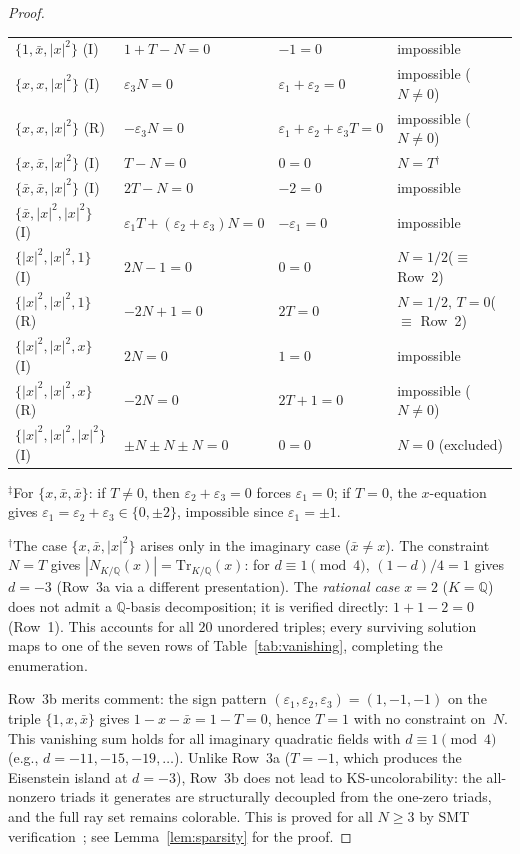 \documentclass[12pt,a4paper]{article}
\newcommand{\Q}{\mathbb{Q}}
\newcommand{\Norm}[1]{N_{K/\Q}\!\left(#1\right)}
\newcommand{\Tr}[1]{\mathrm{Tr}_{K/\Q}\!\left(#1\right)}
\begin{document}
\begin{proof}
\begin{center}
\begin{tabular}{@{}llll@{}}
$\{1, \bar{x}, |x|^2\}$ (I) & $1 + T - N = 0$ & $-1 = 0$ & impossible \\
$\{x, x, |x|^2\}$ (I) & $\varepsilon_3 N = 0$ & $\varepsilon_1{+}\varepsilon_2 = 0$ & impossible ($N \neq 0$) \\
$\{x, x, |x|^2\}$ (R) & $-\varepsilon_3 N = 0$ & $\varepsilon_1{+}\varepsilon_2{+}\varepsilon_3 T = 0$ & impossible ($N \neq 0$) \\
$\{x, \bar{x}, |x|^2\}$ (I) & $T - N = 0$ & $0 = 0$ & $N = T$\;$^\dagger$ \\
$\{\bar{x}, \bar{x}, |x|^2\}$ (I) & $2T - N = 0$ & $-2 = 0$ & impossible \\
$\{\bar{x}, |x|^2, |x|^2\}$ (I) & $\varepsilon_1 T + (\varepsilon_2{+}\varepsilon_3) N = 0$ & $-\varepsilon_1 = 0$ & impossible \\
$\{|x|^2, |x|^2, 1\}$ (I) & $2N - 1 = 0$ & $0 = 0$ & $N = 1/2$\;($\equiv$ Row~2) \\
$\{|x|^2, |x|^2, 1\}$ (R) & $-2N + 1 = 0$ & $2T = 0$ & $N = 1/2,\, T = 0$\;($\equiv$ Row~2) \\
$\{|x|^2, |x|^2, x\}$ (I) & $2N = 0$ & $1 = 0$ & impossible \\
$\{|x|^2, |x|^2, x\}$ (R) & $-2N = 0$ & $2T + 1 = 0$ & impossible ($N \neq 0$) \\
$\{|x|^2, |x|^2, |x|^2\}$ (I) & $\pm N \pm N \pm N = 0$ & $0 = 0$ & $N = 0$ (excluded) \\
\bottomrule
\end{tabular}
\end{center}
\smallskip

\noindent $^\ddagger$For $\{x, \bar{x}, \bar{x}\}$: if $T \neq 0$,
then $\varepsilon_2 + \varepsilon_3 = 0$ forces $\varepsilon_1 = 0$;
if $T = 0$, the $x$-equation gives
$\varepsilon_1 = \varepsilon_2 + \varepsilon_3 \in \{0, \pm 2\}$,
impossible since $\varepsilon_1 = \pm 1$.

\noindent $^\dagger$The case $\{x, \bar{x}, |x|^2\}$ arises only in
the imaginary case ($\bar{x} \neq x$).  The constraint $N = T$
gives $|\Norm{x}| = \Tr{x}$: for $d \equiv 1 \pmod{4}$,
$(1{-}d)/4 = 1$ gives $d = -3$ (Row~3a via a different presentation).
The \emph{rational case} $x = 2$ ($K = \Q$) does not admit a
$\Q$-basis decomposition; it is verified directly: $1 + 1 - 2 = 0$
(Row~1).  This accounts for all $20$ unordered triples; every
surviving solution maps to one of the seven rows of
Table~\ref{tab:vanishing}, completing the enumeration.

Row~3b merits comment: the sign pattern
$(\varepsilon_1, \varepsilon_2, \varepsilon_3) = (1, -1, -1)$ on the
triple $\{1, x, \bar{x}\}$ gives $1 - x - \bar{x} = 1 - T = 0$,
hence $T = 1$ with no constraint on~$N$.  This vanishing sum
holds for all imaginary quadratic fields with
$d \equiv 1 \pmod{4}$ (e.g., $d = -11, -15, -19, \ldots$).
Unlike Row~3a ($T = -1$, which produces the Eisenstein island at
$d = -3$), Row~3b does not lead to KS-uncolorability:
the all-nonzero triads it generates are structurally
decoupled from the one-zero triads, and the full ray set remains
colorable.  This is proved for all $N \geq 3$ by SMT
verification~\cite{deMouraBjorner2008}; see
Lemma~\ref{lem:sparsity} for the proof.


\end{proof}
\end{document}
